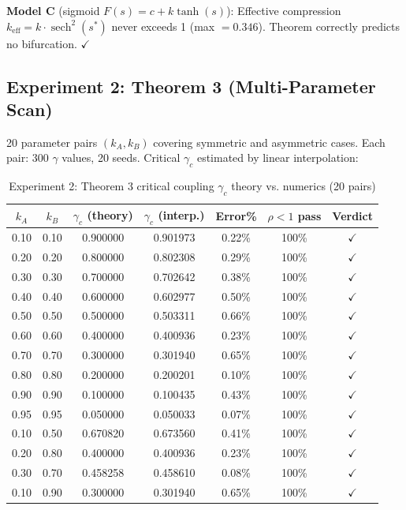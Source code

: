 \documentclass[12pt,a4paper]{article}
\theoremstyle{definition}
\newcommand{\gamc}{\gamma_c}
\begin{document}
\textbf{Model C} (sigmoid $F(s) = c + k\tanh(s)$): Effective compression $k_{\mathrm{eff}} = k \cdot \operatorname{sech}^2(s^*)$ never exceeds 1 (max $= 0.346$). Theorem correctly predicts no bifurcation. $\checkmark$

\subsection{Experiment 2: Theorem 3 (Multi-Parameter Scan)}

20 parameter pairs $(k_A, k_B)$ covering symmetric and asymmetric cases. Each pair: 300 $\gamma$ values, 20 seeds. Critical $\gamc$ estimated by linear interpolation:

\begin{table}[htbp]
\centering
\caption{Experiment 2: Theorem 3 critical coupling $\gamc$ theory vs. numerics (20 pairs)}
\label{tab:exp2-full-en}
\small
\begin{tabular}{ccccccc}
\toprule
$k_A$ & $k_B$ & $\gamc$ (theory) & $\gamc$ (interp.) & Error\% & $\rho<1$ pass & Verdict \\
\midrule
0.10 & 0.10 & 0.900000 & 0.901973 & 0.22\% & 100\% & $\checkmark$ \\
0.20 & 0.20 & 0.800000 & 0.802308 & 0.29\% & 100\% & $\checkmark$ \\
0.30 & 0.30 & 0.700000 & 0.702642 & 0.38\% & 100\% & $\checkmark$ \\
0.40 & 0.40 & 0.600000 & 0.602977 & 0.50\% & 100\% & $\checkmark$ \\
0.50 & 0.50 & 0.500000 & 0.503311 & 0.66\% & 100\% & $\checkmark$ \\
0.60 & 0.60 & 0.400000 & 0.400936 & 0.23\% & 100\% & $\checkmark$ \\
0.70 & 0.70 & 0.300000 & 0.301940 & 0.65\% & 100\% & $\checkmark$ \\
0.80 & 0.80 & 0.200000 & 0.200201 & 0.10\% & 100\% & $\checkmark$ \\
0.90 & 0.90 & 0.100000 & 0.100435 & 0.43\% & 100\% & $\checkmark$ \\
0.95 & 0.95 & 0.050000 & 0.050033 & 0.07\% & 100\% & $\checkmark$ \\
0.10 & 0.50 & 0.670820 & 0.673560 & 0.41\% & 100\% & $\checkmark$ \\
0.20 & 0.80 & 0.400000 & 0.400936 & 0.23\% & 100\% & $\checkmark$ \\
0.30 & 0.70 & 0.458258 & 0.458610 & 0.08\% & 100\% & $\checkmark$ \\
0.10 & 0.90 & 0.300000 & 0.301940 & 0.65\% & 100\% & $\checkmark$ \\

\end{tabular}
\end{table}
\end{document}
